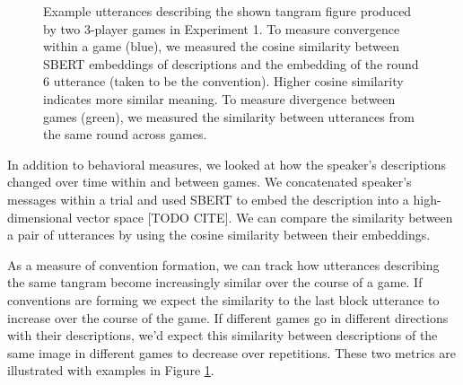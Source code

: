 \documentclass[
  english,
  a4paper,
]{article}
\begin{document}
\begin{figure}
\label{sbert-diagram}
\caption{Example utterances describing the shown tangram figure produced by two 3-player games in Experiment 1. To measure convergence within a game (blue), we measured the cosine similarity between SBERT embeddings of descriptions and the embedding of the round 6 utterance (taken to be the convention). Higher cosine similarity indicates more similar meaning. To measure divergence between games (green), we measured the similarity between utterances from the same round across games.}
\end{figure}

In addition to behavioral measures, we looked at how the speaker's descriptions changed over time within and between games. We concatenated speaker's messages within a trial and used SBERT to embed the description into a high-dimensional vector space {[}TODO CITE{]}. We can compare the similarity between a pair of utterances by using the cosine similarity between their embeddings.

As a measure of convention formation, we can track how utterances describing the same tangram become increasingly similar over the course of a game. If conventions are forming we expect the similarity to the last block utterance to increase over the course of the game. If different games go in different directions with their descriptions, we'd expect this similarity between descriptions of the same image in different games to decrease over repetitions. These two metrics are illustrated with examples in Figure \ref{sbert-diagram}.
\end{document}
